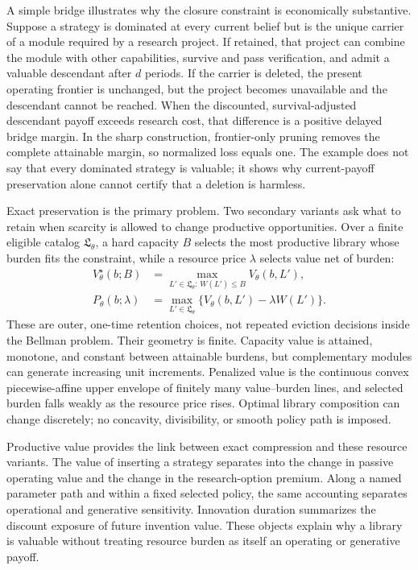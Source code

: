 A simple bridge illustrates why the closure constraint is economically
substantive. Suppose a strategy is dominated at every current belief but is
the unique carrier of a module required by a research project. If retained,
that project can combine the module with other capabilities, survive and pass
verification, and admit a valuable descendant after \(d\) periods. If the
carrier is deleted, the present operating frontier is unchanged, but the
project becomes unavailable and the descendant cannot be reached. When the
discounted, survival-adjusted descendant payoff exceeds research cost, that
difference is a positive delayed bridge margin. In the sharp construction,
frontier-only pruning removes the complete attainable margin, so normalized
loss equals one. The example does not say that every dominated strategy is
valuable; it shows why current-payoff preservation alone cannot certify that
a deletion is harmless.

Exact preservation is the primary problem. Two secondary variants ask what to
retain when scarcity is allowed to change productive opportunities. Over a
finite eligible catalog \(\mathfrak L_\theta\), a hard capacity \(B\) selects
the most productive library whose burden fits the constraint, while a resource
price \(\lambda\) selects value net of burden:
\begin{equation}\label{eq:introduction-resource-extensions}
\begin{aligned}
 V_\theta^\star(b;B)
   &=\max_{L'\in\mathfrak L_\theta:\,W(L')\le B}V_\theta(b,L'),\\
 P_\theta(b;\lambda)
   &=\max_{L'\in\mathfrak L_\theta}
      \{V_\theta(b,L')-\lambda W(L')\}.
\end{aligned}
\end{equation}
These are outer, one-time retention choices, not repeated eviction decisions
inside the Bellman problem. Their geometry is finite. Capacity value is
attained, monotone, and constant between attainable burdens, but complementary
modules can generate increasing unit increments. Penalized value is the
continuous convex piecewise-affine upper envelope of finitely many
value--burden lines, and selected burden falls weakly as the resource price
rises. Optimal library composition can change discretely; no concavity,
divisibility, or smooth policy path is imposed.

Productive value provides the link between exact compression and these
resource variants. The value of inserting a strategy separates into the
change in passive operating value and the change in the research-option
premium. Along a named parameter path and within a fixed selected policy, the
same accounting separates operational and generative sensitivity. Innovation
duration summarizes the discount exposure of future invention value. These
objects explain why a library is valuable without treating resource burden as
itself an operating or generative payoff.

